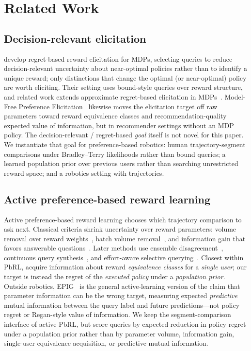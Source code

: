 \section{Related Work}
\label{sec:related}

\subsection{Decision-relevant elicitation}
\citet{regan2009regret} develop regret-based reward elicitation for MDPs,
selecting queries to reduce decision-relevant uncertainty about near-optimal
policies rather than to identify a unique reward; only distinctions that change
the optimal (or near-optimal) policy are worth eliciting.
Their setting uses bound-style queries over reward structure, and related work
extends approximate regret-based elicitation in MDPs~\citep{alizadeh2015approximate}.
Model-Free Preference Elicitation~\citep{modelfree2024} likewise moves the
elicitation target off raw parameters toward reward equivalence classes and
recommendation-quality expected value of information, but in recommender
settings without an MDP policy.
The decision-relevant / regret-based \emph{goal} itself is not novel for this
paper.
We instantiate that goal for preference-based robotics: human trajectory-segment
comparisons under Bradley--Terry likelihoods rather than bound queries; a
learned population prior over previous users rather than searching unrestricted
reward space; and a robotics setting with trajectories.

\subsection{Active preference-based reward learning}
Active preference-based reward learning chooses which trajectory comparison to
ask next.
Classical criteria shrink uncertainty over reward parameters: volume removal over
reward weights~\citep{sadigh2017active}, batch volume
removal~\citep{biyik2018batch}, and information gain that favors answerable
questions~\citep{biyik2019asking}.
Later methods use ensemble disagreement~\citep{hejna2023fewshot}, continuous
query synthesis~\citep{zhou2026preferenceekf}, and effort-aware selective
querying~\citep{muraleedharan2025sparq}.
Closest within PbRL, \citet{ellis2024equivalence} acquire information about
reward \emph{equivalence classes} for a \emph{single user}; our target is
instead the regret of the \emph{executed policy} under a \emph{population prior}.
Outside robotics, EPIG~\citep{epig2023} is the general active-learning version
of the claim that parameter information can be the wrong target, measuring
expected \emph{predictive} mutual information between the query label and future
predictions---not policy regret or Regan-style value of information.
We keep the segment-comparison interface of active PbRL, but score queries by
expected reduction in policy regret under a population prior rather than by
parameter volume, information gain, single-user equivalence acquisition, or
predictive mutual information.

